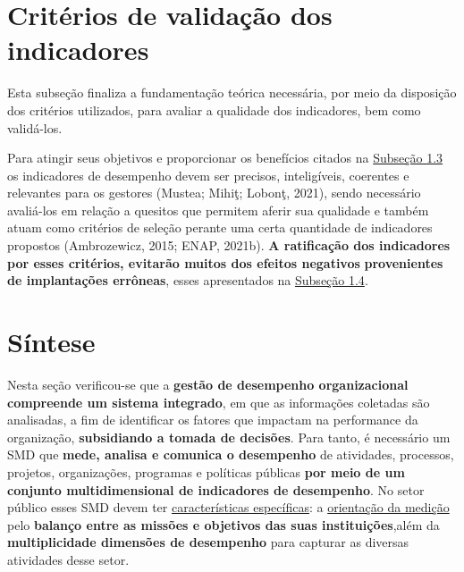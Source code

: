 \documentclass[
  letterpaper,
  DIV=11,
  numbers=noendperiod]{scrreprt}
\begin{document}
\hypertarget{crituxe9rios-de-validauxe7uxe3o-dos-indicadores}{%
\chapter{Critérios de validação dos
indicadores}\label{crituxe9rios-de-validauxe7uxe3o-dos-indicadores}}

{Esta subseção finaliza a fundamentação teórica necessária, por meio da
disposição dos critérios utilizados, para avaliar a qualidade dos
indicadores, bem como validá-los.}

Para atingir seus objetivos e proporcionar os benefícios citados na
\href{/o/AZWDclIWFqqJuBEvyQWk/s/ws6bIBOPv2tLRHdwbB7y/1.-apresentacao/1.3-objetivos-e-beneficios-da-medicao-de-desempenho}{Subseção
1.3} os indicadores de desempenho devem ser precisos, inteligíveis,
coerentes e relevantes para os gestores (Mustea; Mihiţ; Lobonţ, 2021),
sendo necessário avaliá-los em relação a quesitos que permitem aferir
sua qualidade e também atuam como critérios de seleção perante uma certa
quantidade de indicadores propostos (Ambrozewicz, 2015; ENAP, 2021b).
\textbf{A ratificação dos indicadores por esses critérios, evitarão
muitos dos efeitos negativos} \textbf{provenientes de implantações
errôneas}, esses apresentados na
\href{/o/AZWDclIWFqqJuBEvyQWk/s/ws6bIBOPv2tLRHdwbB7y/1.-apresentacao/1.4-consequencias-indesejadas-e-limitacoes-da-medicao-de-desempenho}{Subseção
1.4}.

\hypertarget{suxedntese-1}{%
\chapter*{Síntese}\label{suxedntese-1}}


Nesta seção verificou-se que a \textbf{gestão de desempenho
organizacional compreende um sistema integrado}, em que as informações
coletadas são analisadas, a fim de identificar os fatores que impactam
na performance da organização, \textbf{subsidiando a tomada de
decisões}. Para tanto, é necessário um SMD que \textbf{mede, analisa e
comunica o desempenho} de atividades, processos, projetos, organizações,
programas e políticas públicas \textbf{por meio de um conjunto
multidimensional de indicadores de desempenho}. No setor público esses
SMD devem ter
\href{/o/AZWDclIWFqqJuBEvyQWk/s/ws6bIBOPv2tLRHdwbB7y/2.-fundamentos-teoricos/2.1-sistemas-de-medicao-e-de-gestao-de-desempenho\#caracteristicas-dos-sistemas-de-medicao-de-desempenho}{características
específicas}: a
\href{/o/AZWDclIWFqqJuBEvyQWk/s/ws6bIBOPv2tLRHdwbB7y/2.-fundamentos-teoricos/2.1-sistemas-de-medicao-e-de-gestao-de-desempenho\#orientacao-de-um-smd-para-orgaos-publicos}{orientação
da medição} pelo \textbf{balanço entre as missões e objetivos das suas
instituições},além da \textbf{multiplicidade dimensões de desempenho}
para capturar as diversas atividades desse setor.
\end{document}
